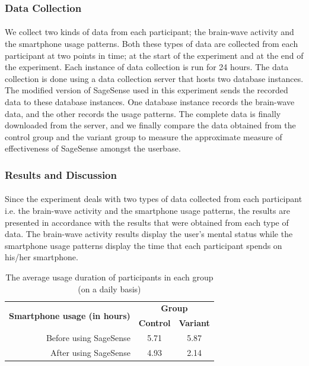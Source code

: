\documentclass{article}
\begin{document}
\subsubsection{Data Collection}

\paragraph{} We collect two kinds of data from each participant; the brain-wave activity and the smartphone usage patterns. Both these types of data are collected from each participant at two points in time; at the start of the experiment and at the end of the experiment. Each instance of data collection is run for 24 hours. The data collection is done using a data collection server that hosts two database instances. The modified version of SageSense used in this experiment sends the recorded data to these database instances. One database instance records the brain-wave data, and the other records the usage patterns. The complete data is finally downloaded from the server, and we finally compare the data obtained from the control group and the variant group to measure the approximate measure of effectiveness of SageSense amongst the userbase.

\subsubsection{Results and Discussion}

\paragraph{} Since the experiment deals with two types of data collected from each participant i.e. the brain-wave activity and the smartphone usage patterns, the results are presented in accordance with the results that were obtained from each type of data. The brain-wave activity results display the user's mental status while the smartphone usage patterns display the time that each participant spends on his/her smartphone.

\begin{table}[hbtp]
  \begin{center}
    \begin{tabular}{|r|c|c|}
    \hline
    \multirow{2}{*}{\textbf{Smartphone usage (in hours)}} & \multicolumn{2}{c|}{\textbf{Group}} \\ \cline{2-3} 
                                                          & \textbf{Control} & \textbf{Variant} \\ \hline
    Before using SageSense                                & 5.71             & 5.87             \\ \hline
    After using SageSense                                 & 4.93             & 2.14             \\ \hline
    \end{tabular}
    \caption{The average usage duration of participants in each group (on a daily basis)}
    \label{tab:tabthree}  
  \end{center}
\end{table}
\end{document}
